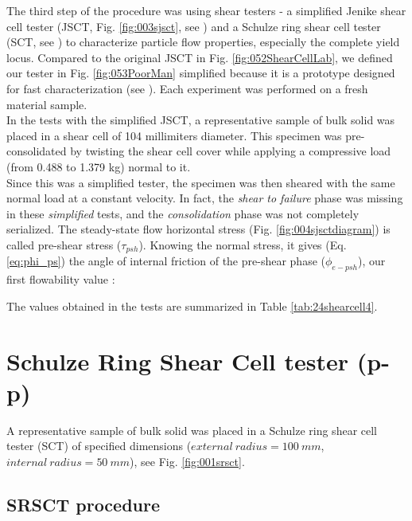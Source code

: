 The third step of the procedure was using shear testers - 
a simplified Jenike shear cell tester (\acs{JSCT}, Fig. \ref{fig:003sjsct}, see
\citet{RefWorks:114}) and a Schulze ring shear cell
tester (\acs{SCT}, see \citet{RefWorks:142}) to characterize particle flow
properties, especially the complete yield locus.
Compared to the original \acs{JSCT} in Fig. \ref{fig:052ShearCellLab}, we
defined our tester in Fig.
\ref{fig:053PoorMan} simplified because it is a prototype designed for fast characterization (see \citet{RefWorks:138}).
Each experiment was performed on a fresh material sample. \\
In the tests with the simplified \acs{JSCT}, a representative sample of bulk solid 
was placed in a shear cell of 104 millimiters diameter. 
This specimen was pre-consolidated by twisting the shear cell cover while applying a 
compressive load (from 0.488 to 1.379 kg) normal to it.\\
Since this was a simplified tester, the specimen was then sheared with the 
same normal load at a constant velocity. 
In fact, the \textit{shear to failure} phase was missing in these \textit{simplified} tests, 
and the \textit{consolidation} phase was not completely serialized.
The steady-state flow horizontal stress (Fig. \ref{fig:004sjsctdiagram}) is
called pre-shear stress ($\tau_{psh}$). 
Knowing the normal stress, it gives (Eq. \ref{eq:phi_ps}) the angle of internal 
friction of the pre-shear phase ($\phi_{e-psh}$), our first flowability value \cite{RefWorks:118}:


The values obtained in the tests are summarized in Table \ref{tab:24shearcell4}.



\section{Schulze Ring Shear Cell tester (p-p)}
\label{sec:SRSCT}


A representative sample of bulk solid was placed in a Schulze ring shear cell
tester (\acs{SCT}) of specified dimensions ($external ~ radius = 100 ~ mm$,
$internal ~ radius = 50 ~ mm$), see Fig. \ref{fig:001srsct}.

\subsection{SRSCT procedure}
\label{subsec:srsctprocedure}

